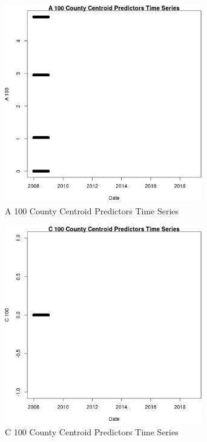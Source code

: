 \begin{figure} 
\centering  
\includegraphics[width=0.77\textwidth]{Code_Outputs/df_report_ML_predictors_CountyCentroid_Locations_Dates_2008-01-01to2018-12-31_A_100vDate.jpg} 
\caption{\label{fig:df_report_ML_predictors_CountyCentroid_Locations_Dates_2008-01-01to2018-12-31A_100vDate}A 100 County Centroid Predictors Time Series} 
\end{figure} 
 

\begin{figure} 
\centering  
\includegraphics[width=0.77\textwidth]{Code_Outputs/df_report_ML_predictors_CountyCentroid_Locations_Dates_2008-01-01to2018-12-31_C_100vDate.jpg} 
\caption{\label{fig:df_report_ML_predictors_CountyCentroid_Locations_Dates_2008-01-01to2018-12-31C_100vDate}C 100 County Centroid Predictors Time Series} 
\end{figure} 
 

